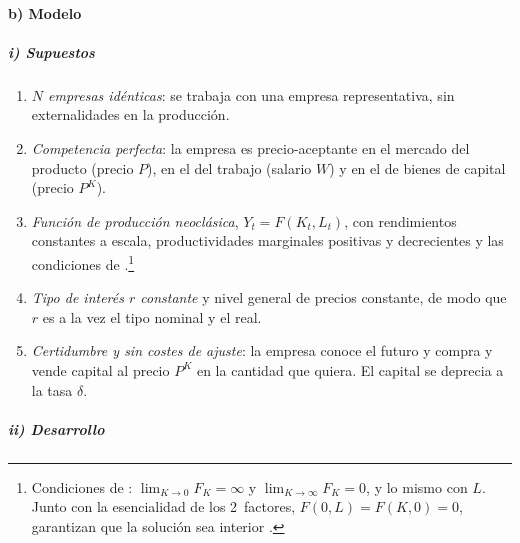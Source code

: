 \documentclass[11pt]{article}
\begin{document}
\paragraph{b) Modelo}

\subparagraph{i) Supuestos}

\begin{enumerate}
\item \emph{$N$ empresas idénticas}: se trabaja con una empresa representativa, sin externalidades en la producción.
\item \emph{Competencia perfecta}: la empresa es precio-aceptante en el mercado del producto (precio $P$), en el del trabajo (salario $W$) y en el de bienes de capital (precio $P^K$).
\item \emph{Función de producción neoclásica}, $Y_t=F(K_t,L_t)$, con rendimientos constantes a escala, productividades marginales positivas y decrecientes y las condiciones de .\footnote{Condiciones de \textcite{Inada1963Two}: $\lim_{K\to 0}F_K=\infty$ y $\lim_{K\to\infty}F_K=0$, y lo mismo con $L$. Junto con la esencialidad de los 2~factores, $F(0,L)=F(K,0)=0$, garantizan que la solución sea interior .}
\item \emph{Tipo de interés $r$ constante} y nivel general de precios constante, de modo que $r$ es a la vez el tipo nominal y el real.
\item \emph{Certidumbre y sin costes de ajuste}: la empresa conoce el futuro y compra y vende capital al precio $P^K$ en la cantidad que quiera. El capital se deprecia a la tasa $\delta$.
\end{enumerate}

\subparagraph{ii) Desarrollo}
\end{document}
